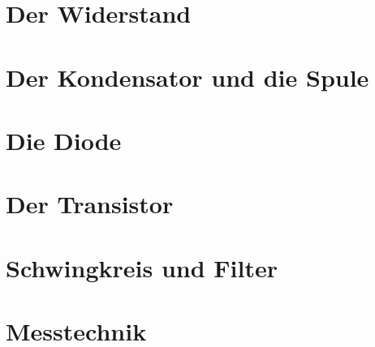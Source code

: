 \documentclass[ngerman,openany,twoside]{Script}
\begin{document}


\newpage


\chapter{Der Widerstand}


\chapter{Der Kondensator und die Spule}


\chapter{Die Diode}


\chapter{Der Transistor}


\chapter{Schwingkreis und Filter}


\chapter{Messtechnik}



\end{document}
